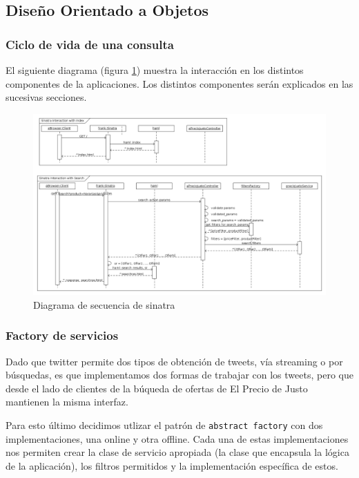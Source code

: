\subsection{Diseño Orientado a Objetos}

\subsubsection{Ciclo de vida de una consulta}

El siguiente diagrama (figura \ref{fig:sequence_sinatra}) muestra la interacción en los distintos componentes de la aplicaciones. Los distintos componentes serán explicados en las sucesivas secciones.

\begin{figure}[h]
\centerline{\includegraphics[width=0.9\paperwidth]{./imgs/sequence_diagram_sinatra.png}}
\caption{Diagrama de secuencia de sinatra}
\label{fig:sequence_sinatra}
\end{figure}


\subsubsection{Factory de servicios}
Dado que twitter permite dos tipos de obtención de tweets, vía streaming o por búsquedas, es que implementamos dos formas de trabajar con los tweets, pero que desde el lado de clientes de la búqueda de ofertas de El Precio de Justo mantienen la misma interfaz.

Para esto último decidimos utlizar el patrón de \texttt{abstract factory} con dos
implementaciones, una online y otra offline. Cada una de estas implementaciones nos permiten crear la clase de servicio apropiada (la clase que encapsula la lógica de la aplicación), los filtros permitidos y la implementación específica de estos.

